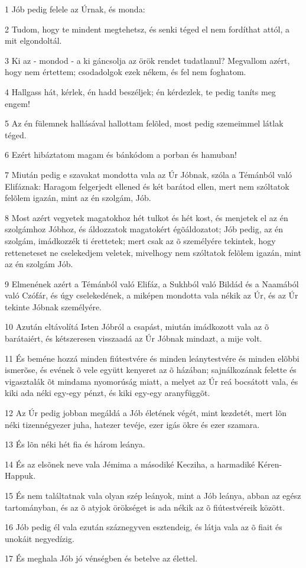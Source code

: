 \par 1 Jób pedig felele az Úrnak, és monda:
\par 2 Tudom, hogy te mindent megtehetsz, és senki téged el nem fordíthat attól, a mit elgondoltál.
\par 3 Ki az - mondod - a ki gáncsolja az örök rendet tudatlanul? Megvallom azért, hogy nem értettem; csodadolgok ezek nékem, és fel nem foghatom.
\par 4 Hallgass hát, kérlek, én hadd beszéljek; én kérdezlek, te pedig taníts meg engem!
\par 5 Az én fülemnek hallásával hallottam felõled, most pedig szemeimmel látlak téged.
\par 6 Ezért hibáztatom magam és bánkódom a porban és hamuban!
\par 7 Miután pedig e szavakat mondotta vala az Úr Jóbnak, szóla a Témánból való Elifáznak: Haragom felgerjedt ellened és két barátod ellen, mert nem szóltatok felõlem igazán, mint az én szolgám, Jób.
\par 8 Most azért vegyetek magatokhoz hét tulkot és hét kost, és menjetek el az én szolgámhoz Jóbhoz, és áldozzatok magatokért égõáldozatot; Jób pedig, az én szolgám, imádkozzék ti érettetek; mert csak az õ személyére tekintek, hogy retteneteset ne cselekedjem veletek, mivelhogy nem szóltatok felõlem igazán, mint az  én szolgám Jób.
\par 9 Elmenének azért a Témánból való Elifáz, a Sukhból való Bildád és a Naamából való Czófár, és úgy cselekedének, a miképen mondotta vala nékik az Úr, és az Úr tekinte Jóbnak személyére.
\par 10 Azután eltávolítá Isten Jóbról a csapást, miután imádkozott vala az õ barátaiért, és kétszeresen visszaadá az Úr Jóbnak mindazt, a mije volt.
\par 11 És beméne hozzá minden fiútestvére és minden leánytestvére és minden elõbbi ismerõse, és evének õ vele együtt kenyeret az õ házában; sajnálkozának felette és vigasztalák õt mindama nyomorúság miatt, a melyet az Úr reá bocsátott vala, és kiki ada néki egy-egy pénzt, és kiki egy-egy aranyfüggõt.
\par 12 Az Úr pedig jobban megáldá a Jób életének végét, mint kezdetét, mert lõn néki tizennégyezer juha, hatezer tevéje, ezer igás ökre és ezer szamara.
\par 13 És lõn néki hét fia és három leánya.
\par 14 És az elsõnek neve vala Jémima a másodiké Kecziha, a harmadiké Kéren-Happuk.
\par 15 És nem találtatnak vala olyan szép leányok, mint a Jób leánya, abban az egész tartományban, és az õ atyjok örökséget is ada nékik az õ fiútestvéreik között.
\par 16 Jób pedig él vala ezután száznegyven esztendeig, és látja vala az õ fiait és unokáit negyedízig.
\par 17 És meghala Jób jó vénségben és betelve az élettel.


